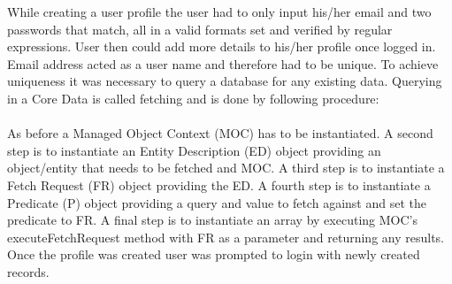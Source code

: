 \documentclass[12pt, a4paper]{report}   %
\begin{document}
\begin{enumerate}
While creating a user profile the user had to only input his/her email and two passwords that match, all in a valid formats set and verified by regular expressions. User then could add more details to his/her profile once logged in. Email address acted as a user name and therefore had to be unique. To achieve uniqueness it was necessary to query a database for any existing data. Querying in a Core Data is called fetching and is done by following procedure:\\ \\
As before a Managed Object Context (MOC) has to be instantiated. A second step is to instantiate an Entity Description (ED) object providing an object/entity that needs to be fetched and MOC. A third step is to instantiate a Fetch Request (FR) object providing the ED. A fourth step is to instantiate a Predicate (P) object providing a query and value to fetch against and set the predicate to FR. A final step is to instantiate an array by executing MOC's executeFetchRequest method with FR as a parameter and returning any results.
Once the profile was created user was prompted to login with newly created records.



\end{enumerate}
\end{document}
